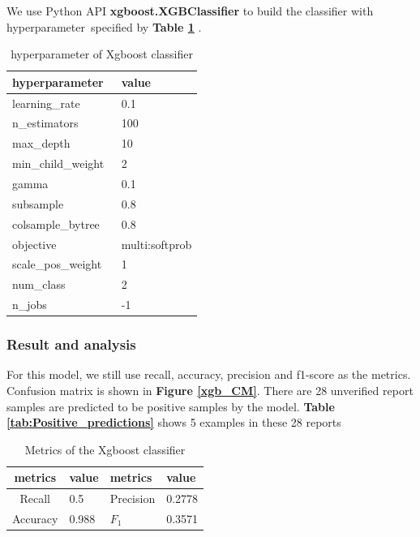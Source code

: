 \documentclass[12pt]{article}
\begin{document}
We use Python API \textbf{xgboost.XGBClassifier} to build the classifier with hyperparameter specified by \textbf{Table \ref{tab:Xgboost_hyperparameter}} .
\begin{table}[htbp]
	\centering
	\caption{hyperparameter of Xgboost classifier}
	  \begin{tabular}{ll}
	  \toprule
	  hyperparameter  & \multicolumn{1}{l}{value} \\
	  \midrule
	  learning\_rate & 0.1 \\
	  \rowcolor{mygray}
	  n\_estimators & 100 \\
	  max\_depth & 10 \\
	  \rowcolor{mygray}
	  min\_child\_weight & 2 \\
	  gamma & 0.1 \\
	  \rowcolor{mygray}
	  subsample & 0.8 \\
	  colsample\_bytree & 0.8 \\
	  \rowcolor{mygray}
	  objective & \multicolumn{1}{l}{multi:softprob} \\
	  scale\_pos\_weight & 1 \\
	  \rowcolor{mygray}
	  num\_class & 2 \\
	  n\_jobs & -1 \\
	  \bottomrule
	  \end{tabular}%
	\label{tab:Xgboost_hyperparameter}%
  \end{table}%


\subsubsection{Result and analysis}
For this model, we still use recall, accuracy, precision and f1-score as the metrics. Confusion matrix is shown in \textbf{Figure \ref{xgb_CM}}. There are 28 unverified report samples are predicted to be positive samples by the model. \textbf{Table \ref{tab:Positive_predictions}} shows 5 examples in these 28 reports 
\begin{table}[H]
	\centering
	\caption{Metrics of the Xgboost classifier}\label{xgb_metrics}
	\begin{tabularx}{0.45\textwidth}{clll}
		\toprule
		 metrics & value &  metrics & value  \\
		\midrule
		Recall & 0.5  &  Precision & 0.2778\\
		Accuracy & 0.988 & $F_1$ & 0.3571\\
		\bottomrule
	\end{tabularx}
\end{table}	
\end{document}
